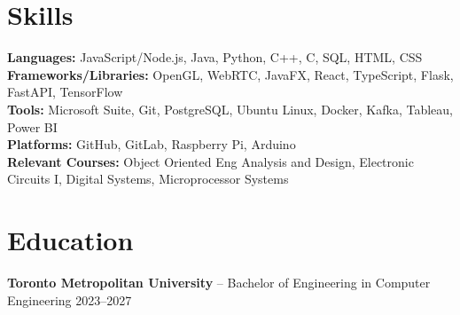 \documentclass[11pt]{article}
\begin{document}
\section*{Skills}
\textbf{Languages:} JavaScript/Node.js, Java, Python, C++, C, SQL, HTML, CSS \\
\textbf{Frameworks/Libraries:} OpenGL, WebRTC, JavaFX, React, TypeScript, Flask, FastAPI, TensorFlow \\
\textbf{Tools:} Microsoft Suite, Git, PostgreSQL, Ubuntu Linux, Docker, Kafka, Tableau, Power BI \\
\textbf{Platforms:} GitHub, GitLab, Raspberry Pi, Arduino \\
\textbf{Relevant Courses:} Object Oriented Eng Analysis and Design, Electronic Circuits I, Digital Systems, Microprocessor Systems

\section*{Education}
\textbf{Toronto Metropolitan University} -- Bachelor of Engineering in Computer Engineering \hfill 2023--2027
\end{document}
